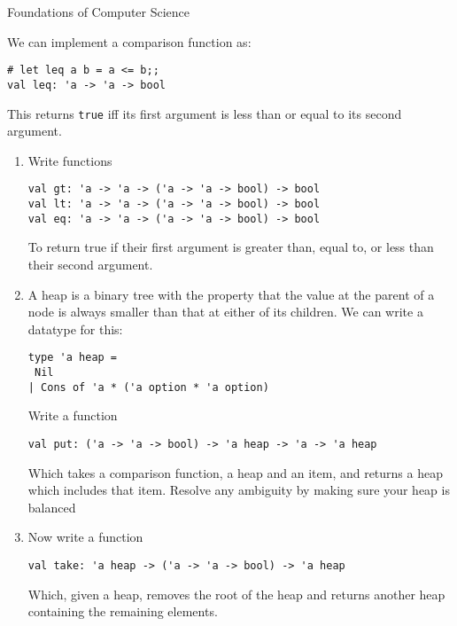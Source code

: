 \documentclass{tripos}  %
\begin{document}
\begin{question}[MockIA,year=2024,paper=1,question=2,author=rrw]{Foundations of Computer Science}


  We can implement a comparison function as:

\begin{verbatim}
# let leq a b = a <= b;;
val leq: 'a -> 'a -> bool
\end{verbatim}

This returns \verb|true| iff its first argument is less than or equal to its second argument.

\begin{enumerate}
\item Write functions

\begin{verbatim}
val gt: 'a -> 'a -> ('a -> 'a -> bool) -> bool
val lt: 'a -> 'a -> ('a -> 'a -> bool) -> bool
val eq: 'a -> 'a -> ('a -> 'a -> bool) -> bool
\end{verbatim}

To return true if their first argument is greater than, equal to, or less than their second argument.

\item A heap is a binary tree with the property that the value at the parent of a node is always smaller than that at either of its children.
  We can write a datatype for this:

\begin{verbatim}
type 'a heap =
 Nil
| Cons of 'a * ('a option * 'a option)
\end{verbatim}

Write a function

\begin{verbatim}
val put: ('a -> 'a -> bool) -> 'a heap -> 'a -> 'a heap
\end{verbatim}

Which takes a comparison function, a heap and an item, and returns a heap which includes that item. Resolve any ambiguity by making sure your heap is balanced

\item Now write a function

\begin{verbatim}
val take: 'a heap -> ('a -> 'a -> bool) -> 'a heap
\end{verbatim}

Which, given a heap, removes the root of the heap and returns another heap containing the remaining elements.


\end{enumerate}
\end{question}
\end{document}
